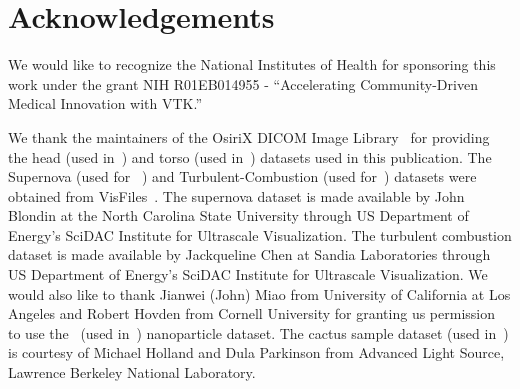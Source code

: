 \section{Acknowledgements}
\label{acknowledgements}
We would like to recognize the National Institutes of Health for sponsoring this
work under the grant NIH R01EB014955 - ``Accelerating Community-Driven Medical
Innovation with VTK.'' 

We thank the maintainers of the OsiriX DICOM Image
Library~\citep{osirix_osirix_2017} for providing the head (used
in~) and torso (used in~) datasets used in this publication. The
Supernova (used for ~) and Turbulent-Combustion (used
for~) datasets were obtained from
VisFiles~\citep{visfiles_visfiles_2007}. The supernova dataset is made available
by John Blondin at the North Carolina State University through US Department
of Energy's SciDAC Institute for Ultrascale Visualization. The turbulent
combustion dataset is made available by Jackqueline Chen at Sandia
Laboratories through US Department of Energy's SciDAC Institute for Ultrascale
Visualization. We would also like to thank Jianwei (John) Miao from University
of California at Los Angeles and Robert Hovden from Cornell University for
granting us permission to use the~ (used in~)
nanoparticle dataset. The
cactus sample dataset (used in~) is courtesy of Michael
Holland and Dula Parkinson from Advanced Light Source, Lawrence Berkeley National
Laboratory.